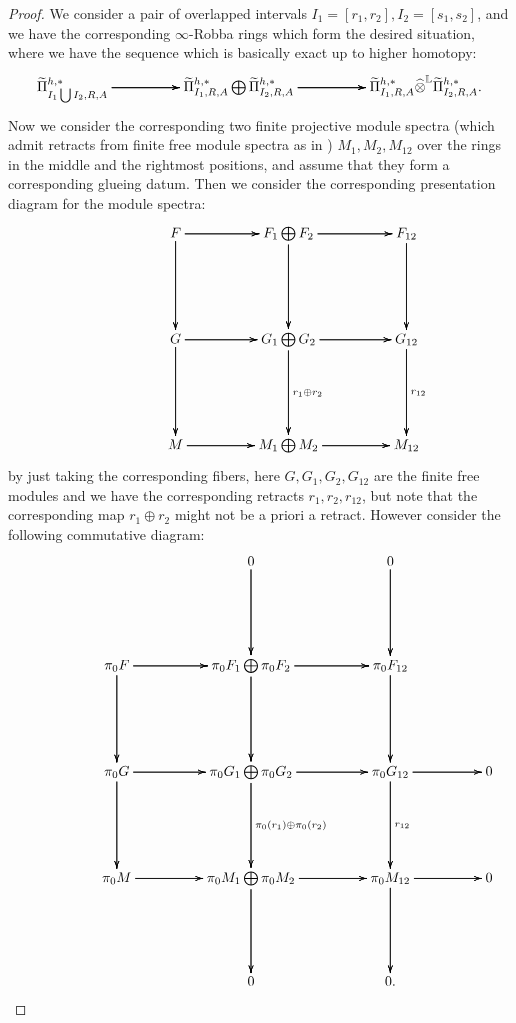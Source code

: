 \documentclass[12pt]{amsart}
\theoremstyle{definition}
\numberwithin{equation}{section}
\begin{document}
\begin{proof}
We consider a pair of overlapped intervals $I_1=[r_1,r_2],I_2=[s_1,s_2]$, and we have the corresponding $\infty$-Robba rings which form the desired situation, where we have the sequence which is basically exact up to higher homotopy:
\[
\xymatrix@C+2pc@R+3pc{
\widetilde{\Pi}^{h,*}_{I_1\bigcup I_2,R,A} \ar[r]\ar[r] \ar[r] \ar[r]  &\widetilde{\Pi}^{h,*}_{I_1,R,A}\bigoplus \widetilde{\Pi}^{h,*}_{I_2,R,A} \ar[r] \ar[r] \ar[r]\ar[r] &\widetilde{\Pi}^{h,*}_{I_1,R,A}\widehat{\otimes}^\mathbb{L}\widetilde{\Pi}^{h,*}_{I_2,R,A}.  
}
\] 
Now we consider the corresponding two finite projective module spectra (which admit retracts from finite free module spectra as in \cite[Proposition 7.2.2.7]{Lu1}) $M_1,M_2,M_{12}$ over the rings in the middle and the rightmost positions, and assume that they form a corresponding glueing datum. Then we consider the corresponding presentation diagram for the module spectra:
\[
\xymatrix@C+2pc@R+3pc{
 &F \ar[r] \ar[r] \ar[r] \ar[d] \ar[d] \ar[d] &F_1\bigoplus F_2 \ar[d] \ar[d] \ar[d] \ar[r] \ar[r] \ar[r] &F_{12} \ar[d] \ar[d] \ar[d] \\
&G \ar[r] \ar[r] \ar[r] \ar[d] \ar[d] \ar[d] &G_1\bigoplus G_2 \ar[d]^{r_1\oplus r_2} \ar[d] \ar[d] \ar[r] \ar[r] \ar[r] &G_{12} \ar[d]^{r_{12}} \ar[d] \ar[d] \\
&M \ar[r] \ar[r] \ar[r] &M_1\bigoplus M_2 \ar[r] \ar[r] \ar[r] &M_{12} \\
}
\]  
by just taking the corresponding fibers, here $G,G_1,G_2,G_{12}$ are the finite free modules and we have the corresponding retracts $r_1,r_2,r_{12}$, but note that the corresponding map $r_1\oplus r_2$ might not be a priori a retract. However consider the following commutative diagram:
\[
\xymatrix@C+2pc@R+3pc{
& &0 \ar[d] \ar[d] \ar[d] &0 \ar[d] \ar[d] \ar[d] \\
 &\pi_0 F \ar[r] \ar[r] \ar[r] \ar[d] \ar[d] \ar[d] &\pi_0F_1\bigoplus \pi_0F_2 \ar[d] \ar[d] \ar[d] \ar[r] \ar[r] \ar[r] &\pi_0F_{12} \ar[d] \ar[d] \ar[d] \\
&\pi_0G \ar[r] \ar[r] \ar[r] \ar[d] \ar[d] \ar[d] &\pi_0G_1\bigoplus \pi_0G_2 \ar[d]^{\pi_0(r_1)\oplus \pi_0(r_2)} \ar[d] \ar[d] \ar[r] \ar[r] \ar[r] &\pi_0G_{12} \ar[d]^{r_{12}} \ar[d] \ar[d] \ar[r] \ar[r] \ar[r]&0 \\
&\pi_0M \ar[r] \ar[r] \ar[r] &\pi_0M_1\bigoplus \pi_0M_2\ar[d] \ar[d] \ar[d]  \ar[r] \ar[r] \ar[r] &\pi_0M_{12}\ar[d] \ar[d] \ar[d]  \ar[r] \ar[r] \ar[r]&0 \\
&&0&0.
}
\] 

\end{proof}
\end{document}
